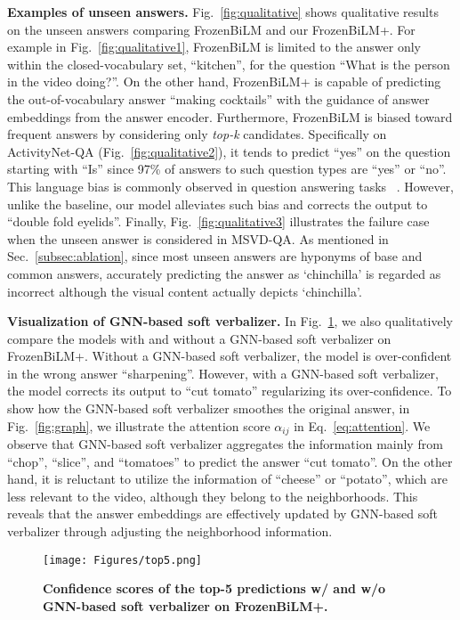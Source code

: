 \documentclass[10pt,twocolumn,letterpaper]{article}
\begin{document}
\noindent \textbf{Examples of unseen answers.}
Fig.~\ref{fig:qualitative} shows qualitative results on the unseen answers comparing FrozenBiLM and our FrozenBiLM+.
For example in Fig.~\ref{fig:qualitative1}, FrozenBiLM is limited to the answer only within the closed-vocabulary set, ``kitchen'', for the question ``What is the person in the video doing?''. 
On the other hand, FrozenBiLM+ is capable of predicting the out-of-vocabulary answer ``making cocktails'' with the guidance of answer embeddings from the answer encoder. 
Furthermore, FrozenBiLM is biased toward frequent answers by considering only \textit{top-k} candidates.
Specifically on ActivityNet-QA (Fig.~\ref{fig:qualitative2}), it tends to predict ``yes'' on the question starting with ``Is'' since 97\% of answers to such question types are ``yes'' or ``no''.
This language bias is commonly observed in question answering tasks ~\cite{niu2021counterfactual, ramakrishnan2018overcoming, cadene2019rubi}. 
However, unlike the baseline, our model alleviates such bias and corrects the output to ``double fold eyelids''.
Finally, Fig.~\ref{fig:qualitative3} illustrates the failure case when the unseen answer is considered in MSVD-QA.
As mentioned in Sec.~\ref{subsec:ablation}, since most unseen answers are hyponyms of base and common answers, accurately predicting the answer as `chinchilla' is regarded as incorrect although the visual content actually depicts `chinchilla'.

\noindent \textbf{Visualization of GNN-based soft verbalizer.}
In Fig.~\ref{fig:top5}, we also qualitatively compare the models with and without a GNN-based soft verbalizer on FrozenBiLM+.
Without a GNN-based soft verbalizer, the model is over-confident in the wrong answer ``sharpening''.
However, with a GNN-based soft verbalizer, the model corrects its output to ``cut tomato'' regularizing its over-confidence.
To show how the GNN-based soft verbalizer smoothes the original answer, in Fig.~\ref{fig:graph}, we illustrate the attention score $\alpha_{ij}$ in Eq.~\eqref{eq:attention}.
We observe that GNN-based soft verbalizer aggregates the information mainly from ``chop'', ``slice'', and ``tomatoes'' to predict the answer ``cut tomato''.
On the other hand, it is reluctant to utilize the information of ``cheese'' or ``potato'', which are less relevant to the video, although they belong to the neighborhoods. 
This reveals that the answer embeddings are effectively updated by GNN-based soft verbalizer through adjusting the neighborhood information. \begin{figure}[t] 
    \centering
        \texttt{[image: Figures/top5.png]}
        \caption{\textbf{Confidence scores of the top-5 predictions w/ and w/o GNN-based soft verbalizer on FrozenBiLM+.}}
        \label{fig:top5}
\end{figure}
\end{document}
